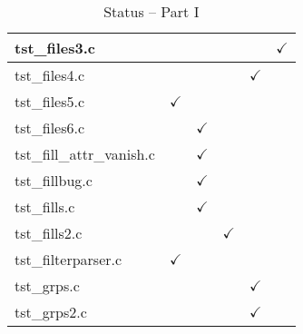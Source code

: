 \begin{table}[H]
\begin{tabular}{|l|c|c|c|c|c|}
tst\_files3.c           &               &               &               &               &  $\checkmark$ \\ \hline
tst\_files4.c           &               &               &               & $\checkmark$  &               \\ \hline
tst\_files5.c           & $\checkmark$  &               &               &               &               \\ \hline
tst\_files6.c           &               & $\checkmark$  &               &               &               \\ \hline
tst\_fill\_attr\_vanish.c   &           & $\checkmark$  &               &               &               \\ \hline
tst\_fillbug.c          &               & $\checkmark$  &               &               &               \\ \hline
tst\_fills.c            &               & $\checkmark$  &               &               &               \\ \hline
tst\_fills2.c           &               &               & $\checkmark$  &               &               \\ \hline
tst\_filterparser.c     & $\checkmark$  &               &               &               &               \\ \hline
tst\_grps.c             &               &               &               & $\checkmark$  &               \\ \hline
tst\_grps2.c            &               &               &               & $\checkmark$  &               \\ \hline
\hline
\end{tabular}
\caption{\label{tab:nc_test4_status_1} Status -- Part I}
\end{table}

\clearpage

